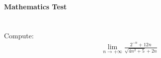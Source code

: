 \documentclass[12pt]{article}
\begin{document}
	
	\begin{center}
		\Large\textbf{Mathematics Test}
	\end{center}
	\vspace{1cm}
	
	\section*{}
	Compute:
	\begin{align*}
		\lim_{{n \to +\infty}} \frac{2^{-n} + 12n}{\sqrt{4n^2 + 5} + 2n}
	\end{align*}
	
	
\end{document}
